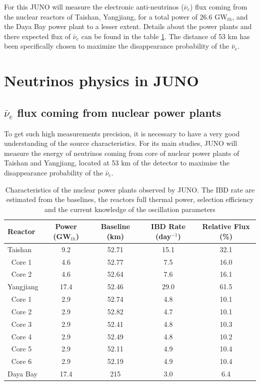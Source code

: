 For this JUNO will measure the electronic anti-neutrinos ($\bar{\nu}_e$) flux coming from the nuclear reactors of Taishan, Yangjiang, for a total power of 26.6 GW$_{th}$, and the Daya Bay power plant to a lesser extent. Details about the power plants and there expected flux of $\bar{\nu}_e$ can be found in the table \ref{tab:power_plants}.
The distance of 53 km has been specifically chosen to maximize the disappearance probability of the $\bar{\nu}_e$.

\section{Neutrinos physics in JUNO}

\subsection{$\bar{\nu}_e$ flux coming from nuclear power plants}

To get such high measurements precision, it is necessary to have a very good understanding of the source characteristics. For its main studies, JUNO will measure the energy of neutrinos coming from core of nuclear power plants of Taishan and Yangjiang, located at 53 km of the detector to maximise the disappearance probability of the $\bar{\nu}_e$.

\begin{table}[ht]
  \centering
  \begin{tabular}{l c c c c}
    \hline
    Reactor & Power (GW$_{th}$) & Baseline (km) & IBD Rate (day$^{-1}$) & Relative Flux (\%) \\
    \hline
    Taishan    & 9.2  & 52.71 & 15.1 & 32.1 \\
    $~$ Core 1 & 4.6  & 52.77 & 7.5  & 16.0 \\
    $~$ Core 2 & 4.6  & 52.64 & 7.6  & 16.1 \\
    Yangjiang  & 17.4 & 52.46 & 29.0 & 61.5 \\
    $~$ Core 1 & 2.9  & 52.74 & 4.8  & 10.1 \\
    $~$ Core 2 & 2.9  & 52.82 & 4.7  & 10.1 \\
    $~$ Core 3 & 2.9  & 52.41 & 4.8  & 10.3 \\
    $~$ Core 4 & 2.9  & 52.49 & 4.8  & 10.2 \\
    $~$ Core 5 & 2.9  & 52.11 & 4.9  & 10.4 \\
    $~$ Core 6 & 2.9  & 52.19 & 4.9  & 10.4 \\
    Daya Bay   & 17.4 & 215   & 3.0  & 6.4  \\
    \hline
  \end{tabular}
  \caption{Characteristics of the nuclear power plants observed by JUNO. The IBD rate are estimated from the baselines, the reactors full thermal power, selection efficiency and the current knowledge of the oscillation parameters}
  \label{tab:power_plants}
\end{table}

